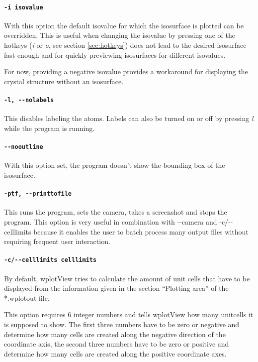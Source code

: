 \documentclass[12pt, parskip=full]{scrartcl}
\begin{document}
\paragraph{\texttt{-i isovalue}}

With this option the default isovalue for which the isosurface is plotted can
be overridden.  This is useful when changing the isovalue by pressing one of
the hotkeys (\emph{i} or \emph{o}, see section \ref{sec:hotkeys}) does not lead to the desired
isosurface fast enough and for quickly previewing isosurfaces for different
isovalues.

For now, providing a negative isovalue provides a workaround for displaying the crystal
structure without an isosurface.


\paragraph{\texttt{-l, -{}-nolabels}}
This disables labeling the atoms. Labels can also be turned on or off by
pressing \emph{l} while the program is running.

\paragraph{\texttt{-{}-nooutline}}
With this option set, the program doesn't show the bounding box of the
isosurface.

\paragraph{\texttt{-ptf, -{}-printtofile}}
This runs the program, sets the camera, takes a screenshot and stops the
program. This option is very useful in combination with -{}-camera and -c/-{}-celllimits 
because it enables the user to batch process many output files without requiring frequent
user interaction.

\paragraph{\texttt{-c/-{}-celllimits celllimits}}
By default, wplotView tries to calculate the amount of unit cells that have to
be displayed from the information given in the section ``Plotting area'' of the
*.wplotout file.

This option requires 6 integer numbers and tells wplotView how many unitcells
it is supposed to show. The first three numbers have to be zero or negative and
determine how many cells are created along the negative direction of the
coordinate axis, the second three numbers have to be zero or positive and
determine how many cells are created along the positive coordinate axes.
\end{document}
